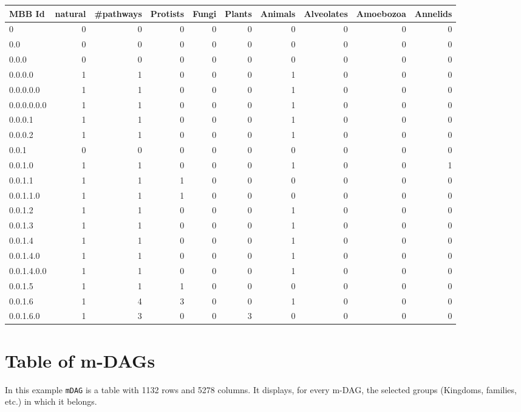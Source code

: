\documentclass[
  letterpaper,
  DIV=11,
  numbers=noendperiod]{scrreprt}
\begin{document}
\begin{tabular}{l|r|r|r|r|r|r|r|r|r}
\hline
MBB Id & natural & \#pathways & Protists & Fungi & Plants & Animals & Alveolates & Amoebozoa & Annelids\\
\hline
0 & 0 & 0 & 0 & 0 & 0 & 0 & 0 & 0 & 0\\
\hline
0.0 & 0 & 0 & 0 & 0 & 0 & 0 & 0 & 0 & 0\\
\hline
0.0.0 & 0 & 0 & 0 & 0 & 0 & 0 & 0 & 0 & 0\\
\hline
0.0.0.0 & 1 & 1 & 0 & 0 & 0 & 1 & 0 & 0 & 0\\
\hline
0.0.0.0.0 & 1 & 1 & 0 & 0 & 0 & 1 & 0 & 0 & 0\\
\hline
0.0.0.0.0.0 & 1 & 1 & 0 & 0 & 0 & 1 & 0 & 0 & 0\\
\hline
0.0.0.1 & 1 & 1 & 0 & 0 & 0 & 1 & 0 & 0 & 0\\
\hline
0.0.0.2 & 1 & 1 & 0 & 0 & 0 & 1 & 0 & 0 & 0\\
\hline
0.0.1 & 0 & 0 & 0 & 0 & 0 & 0 & 0 & 0 & 0\\
\hline
0.0.1.0 & 1 & 1 & 0 & 0 & 0 & 1 & 0 & 0 & 1\\
\hline
0.0.1.1 & 1 & 1 & 1 & 0 & 0 & 0 & 0 & 0 & 0\\
\hline
0.0.1.1.0 & 1 & 1 & 1 & 0 & 0 & 0 & 0 & 0 & 0\\
\hline
0.0.1.2 & 1 & 1 & 0 & 0 & 0 & 1 & 0 & 0 & 0\\
\hline
0.0.1.3 & 1 & 1 & 0 & 0 & 0 & 1 & 0 & 0 & 0\\
\hline
0.0.1.4 & 1 & 1 & 0 & 0 & 0 & 1 & 0 & 0 & 0\\
\hline
0.0.1.4.0 & 1 & 1 & 0 & 0 & 0 & 1 & 0 & 0 & 0\\
\hline
0.0.1.4.0.0 & 1 & 1 & 0 & 0 & 0 & 1 & 0 & 0 & 0\\
\hline
0.0.1.5 & 1 & 1 & 1 & 0 & 0 & 0 & 0 & 0 & 0\\
\hline
0.0.1.6 & 1 & 4 & 3 & 0 & 0 & 1 & 0 & 0 & 0\\
\hline
0.0.1.6.0 & 1 & 3 & 0 & 0 & 3 & 0 & 0 & 0 & 0\\
\hline
\end{tabular}

\hypertarget{table-of-m-dags}{%
\section{Table of m-DAGs}\label{table-of-m-dags}}

In this example \texttt{mDAG} is a table with 1132 rows and 5278
columns. It displays, for every m-DAG, the selected groups (Kingdoms,
families, etc.) in which it belongs.
\end{document}
